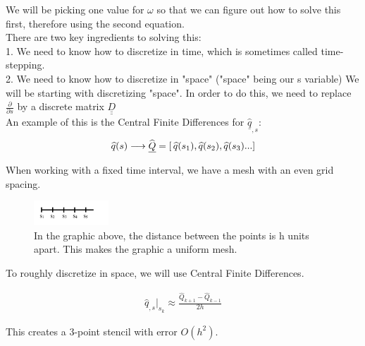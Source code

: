 \documentclass[12pt]{article}
\def \ms {\medskip}
\def \ss {\smallskip}
\def \lra {\longrightarrow}
\newcommand{\bunderline}[1]{\underline{#1}}
\renewcommand{\vec}[1]{{\bunderline{#1}}}
\newcommand{\mat}[1]{{\bunderline{\bunderline{#1}}}}
\begin{document}
We will be picking one value for $\omega$ so that we can figure out how to solve this first, therefore using the second equation. \\

There are two key ingredients to solving this: \\
1. We need to know how to discretize in time, which is sometimes called time-stepping. \\
2. We need to know how to discretize in "space" ("space" being our s variable)
We will be starting with discretizing "space".
In order to do this, we need to replace $\frac{\partial}{\partial s}$ by a discrete matrix $\mat{D}$ \\

An example of this is the Central Finite Differences for $\widehat{\vec{q}}_{,s}$: \\

\begin{align*}
\widehat{q}(s)\ms\lra\ms\widehat{\vec{Q}} =  [\,\widehat{q}(s_1)\ms,\ms\widehat{q}(s_2)\ms,\ms\widehat{q}(s_3)\ss.\ss.\ss.\ss]
\end{align*}

When working with a fixed time interval, we have a mesh with an even grid spacing.

\begin{figure}[H]
\centering
\includegraphics[width=0.25\textwidth]{MeshLine.jpg}
\caption{In the graphic above, the distance between the points is h units apart. This makes the graphic a uniform mesh.}
\end{figure}

To roughly discretize in space, we will use Central Finite Differences. 

\begin{align*}
\widehat{q}_{,s} |_{s_k} \approx \frac{\widehat{Q}_{k+1} - \widehat{Q}_{k-1}}{2h}
\end{align*}

This creates a 3-point stencil with error $O(h^2)$. 
\end{document}
